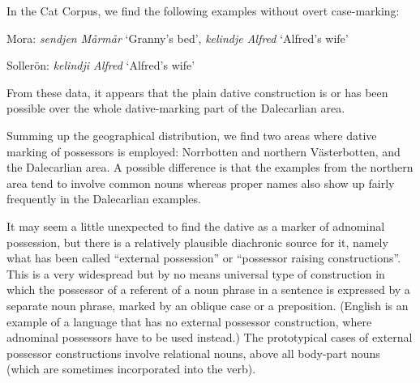 In the Cat Corpus, we find the following examples without overt case-marking:


\item 


Mora: \textit{sendjen Mårmår} ‘Granny’s bed’, \textit{kelindje Alfred }‘Alfred’s wife’


Sollerön: \textit{kelindji Alfred} ‘Alfred’s wife’


From these data, it appears that the plain dative construction is or has been possible over the whole dative-marking part of the Dalecarlian area. 


Summing up the geographical distribution, we find two areas where dative marking of possessors is employed: Norrbotten and northern Västerbotten, and the Dalecarlian area. A possible difference is that the examples from the northern area tend to involve common nouns whereas proper names also show up fairly frequently in the Dalecarlian examples. 


It may seem a little unexpected to find the dative as a marker of adnominal possession, but there is a relatively plausible diachronic source for it, namely what has been called “external possession” or “possessor raising constructions”. This is a very widespread but by no means universal type of construction in which the possessor of a referent of a noun phrase in a sentence is expressed by a separate noun phrase, marked by an oblique case or a preposition. (English is an example of a language that has no external possessor construction, where adnominal possessors have to be used instead.) The prototypical cases of external possessor constructions involve relational nouns, above all body-part nouns (which are sometimes incorporated into the verb).

